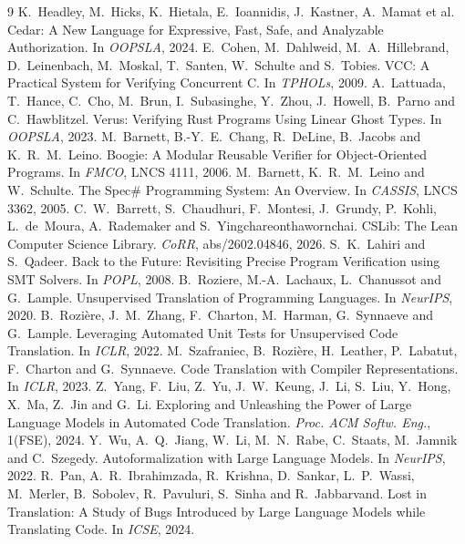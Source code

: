 \documentclass[11pt,letterpaper]{article}
\begin{document}
\begin{thebibliography}{9}
  K.~Headley, M.~Hicks, K.~Hietala, E.~Ioannidis, J.~Kastner,
  A.~Mamat et al. Cedar: A New Language for
  Expressive, Fast, Safe, and Analyzable Authorization. In \emph{OOPSLA}, 2024.
 E.~Cohen, M.~Dahlweid, M.~A.~Hillebrand, D.~Leinenbach,
  M.~Moskal, T.~Santen, W.~Schulte and S.~Tobies. VCC: A Practical System for
  Verifying Concurrent C. In \emph{TPHOLs}, 2009.
 A.~Lattuada, T.~Hance, C.~Cho, M.~Brun,
  I.~Subasinghe, Y.~Zhou, J.~Howell, B.~Parno and C.~Hawblitzel. Verus:
  Verifying Rust Programs Using Linear Ghost Types. In \emph{OOPSLA}, 2023.
 M.~Barnett, B.-Y.~E.~Chang, R.~DeLine, B.~Jacobs
  and K.~R.~M.~Leino. Boogie: A Modular Reusable Verifier for Object-Oriented
  Programs. In \emph{FMCO}, LNCS 4111, 2006.
 M.~Barnett, K.~R.~M.~Leino and W.~Schulte. The
  Spec\# Programming System: An Overview. In \emph{CASSIS}, LNCS 3362, 2005.
 C.~W.~Barrett, S.~Chaudhuri, F.~Montesi, J.~Grundy,
  P.~Kohli, L.~de~Moura, A.~Rademaker and S.~Yingchareonthawornchai. CSLib: The
  Lean Computer Science Library. \emph{CoRR}, abs/2602.04846, 2026.
 S.~K.~Lahiri and S.~Qadeer. Back to the Future:
  Revisiting Precise Program Verification using SMT Solvers. In \emph{POPL},
  2008.
 B.~Roziere, M.-A.~Lachaux, L.~Chanussot and
  G.~Lample. Unsupervised Translation of Programming Languages. In
  \emph{NeurIPS}, 2020.
 B.~Rozi{\`e}re, J.~M.~Zhang, F.~Charton,
  M.~Harman, G.~Synnaeve and G.~Lample. Leveraging Automated Unit Tests for
  Unsupervised Code Translation. In \emph{ICLR}, 2022.
 M.~Szafraniec, B.~Rozi{\`e}re, H.~Leather,
  P.~Labatut, F.~Charton and G.~Synnaeve. Code Translation with Compiler
  Representations. In \emph{ICLR}, 2023.
 Z.~Yang, F.~Liu, Z.~Yu, J.~W.~Keung, J.~Li, S.~Liu,
  Y.~Hong, X.~Ma, Z.~Jin and G.~Li. Exploring and Unleashing the Power of
  Large Language Models in Automated Code Translation. \emph{Proc. ACM Softw.
  Eng.}, 1(FSE), 2024.
 Y.~Wu, A.~Q.~Jiang, W.~Li, M.~N.~Rabe,
  C.~Staats, M.~Jamnik and C.~Szegedy. Autoformalization with Large Language
  Models. In \emph{NeurIPS}, 2022.
 R.~Pan, A.~R.~Ibrahimzada, R.~Krishna, D.~Sankar,
  L.~P.~Wassi, M.~Merler, B.~Sobolev, R.~Pavuluri, S.~Sinha and
  R.~Jabbarvand. Lost in Translation: A Study of Bugs Introduced by Large
  Language Models while Translating Code. In \emph{ICSE}, 2024.

\end{thebibliography}
\end{document}
